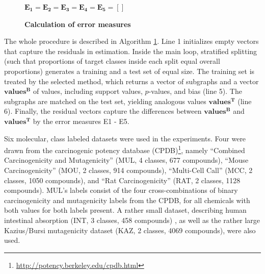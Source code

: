 \documentclass{sig-alternate}
\begin{document}
\begin{figure}[t]
  \begin{minipage}[h]{.66\textwidth}
    \begin{algorithm2e}[H]
      $\mathbf{E_1}=\mathbf{E_2}=\mathbf{E_3}=\mathbf{E_4}=\mathbf{E_5}=\left[ \right]$\;
      \caption{\textbf{Calculation of error measures}\label{alg:pValEstimate}}
    \end{algorithm2e}
  \end{minipage}
  \begin{minipage}[h]{.34\textwidth}
    
  \end{minipage}
\end{figure}

The whole procedure is described in Algorithm \ref{alg:pValEstimate}.
Line 1 initializes empty vectors that capture the residuals in estimation.
Inside the main loop, stratified splitting (such that proportions of target classes
inside each split equal overall proportions) generates a training and a test
set of equal size. The training set is treated by the selected method, which
returns a vector of subgraphs and a vector $\mathbf{values^B}$ of values,
including support values, $p$-values, and bias (line 5). The subgraphs are matched on
the test set, yielding analogous values $\mathbf{values^T}$ (line 6). Finally, the
residual vectors capture the differences between $\mathbf{values^B}$ and
$\mathbf{values^T}$ by the error measures E1 - E5.

Six molecular, class labeled datasets were used in the experiments. 
Four were drawn from the carcinogenic potency database
(CPDB)\footnote{\url{http://potency.berkeley.edu/cpdb.html}}, namely 
``Combined Carcinogenicity and Mutagenicity'' (MUL, 4 classes, 677 compounds),
``Mouse Carcinogenicity'' (MOU, 2 classes, 914 compounds), 
``Multi-Cell Call'' (MCC, 2 classes, 1050 compounds), and 
``Rat Carcinogenicity'' (RAT, 2 classes, 1128 compounds). 
MUL's labels consist of the four cross-combinations of binary carcinogenicity
and mutagenicity labels from the CPDB, for all chemicals with both values for
both labels present.
A rather small dataset, describing human intestinal absorption (INT, 3 classes, 458 compounds) \cite{Suenderhauf10Combinatorial}, as well as
the rather large Kazius/Bursi mutagenicity dataset (KAZ, 2 classes, 4069 compounds), \cite{kazius05derivation} were also used.
\end{document}
